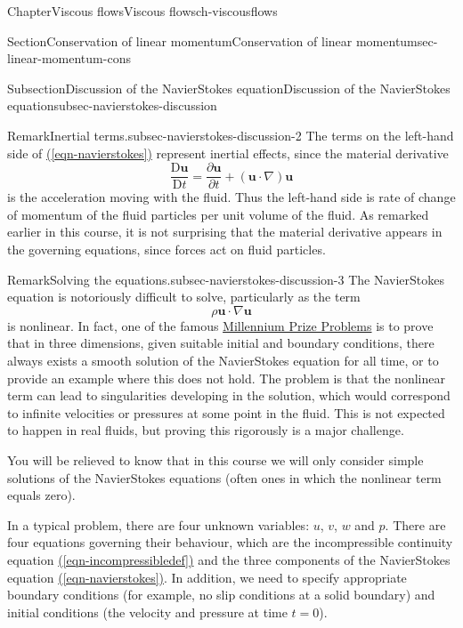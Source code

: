 \documentclass[oneside,10pt,]{book}
\newcommand{\xreffont}{\relax}
\numberwithin{equation}{section}
\newcommand{\DD}[2]{\frac{\mathrm{D}#1}{\mathrm{D}#2}}
\newcommand{\pd}[2]{\frac{\partial#1}{\partial#2}}
\newcommand{\bu}{\boldsymbol{u}}
\begin{document}
\begin{chapterptx}{Chapter}{Viscous flows}{}{Viscous flows}{}{}{ch-viscousflows}
\begin{sectionptx}{Section}{Conservation of linear momentum}{}{Conservation of linear momentum}{}{}{sec-linear-momentum-cons}
\begin{subsectionptx}{Subsection}{Discussion of the Navier\textendash{}Stokes equation}{}{Discussion of the Navier\textendash{}Stokes equation}{}{}{subsec-navierstokes-discussion}
\begin{remark}{Remark}{Inertial terms.}{subsec-navierstokes-discussion-2}%
The terms on the left-hand side of  \hyperref[eqn-navierstokes]{({\xreffont\ref{eqn-navierstokes}})} represent inertial effects, since the material derivative%
\begin{equation*}
\DD{\bu}{t}=\pd{\bu}{t}+(\bu\cdot\nabla)\bu
\end{equation*}
is the acceleration moving with the fluid.  Thus the left-hand side is rate of change of momentum of the fluid particles per unit volume of the fluid. As remarked earlier in this course, it is not surprising that the material derivative appears in the governing equations, since forces act on fluid particles.%
\end{remark}
\begin{remark}{Remark}{Solving the equations.}{subsec-navierstokes-discussion-3}%
The Navier\textendash{}Stokes equation is notoriously difficult to solve, particularly as the term%
\begin{equation*}
\rho\bu\cdot\nabla\bu
\end{equation*}
is nonlinear. In fact, one of the famous \href{https://www.claymath.org/millennium-problems/}{Millennium Prize Problems} is to prove that in three dimensions, given suitable initial and boundary conditions, there always exists a smooth solution of the Navier\textendash{}Stokes equation for all time, or to provide an example where this does not hold. The problem is that the nonlinear term can lead to singularities developing in the solution, which would correspond to infinite velocities or pressures at some point in the fluid. This is not expected to happen in real fluids, but proving this rigorously is a major challenge.%
\par
You will be relieved to know that in this course we will only consider simple solutions of the Navier\textendash{}Stokes equations (often ones in which the nonlinear term equals zero).%
\par
In a typical problem, there are four unknown variables: \(u\), \(v\), \(w\) and \(p\). There are four equations governing their behaviour, which are the incompressible continuity equation \hyperref[eqn-incompressibledef]{({\xreffont\ref{eqn-incompressibledef}})} and the three components of the Navier\textendash{}Stokes equation \hyperref[eqn-navierstokes]{({\xreffont\ref{eqn-navierstokes}})}. In addition, we need to specify appropriate boundary conditions (for example, no slip conditions at a solid boundary) and initial conditions (the velocity and pressure at time \(t=0\)).%

\end{remark}
\end{subsectionptx}
\end{sectionptx}
\end{chapterptx}
\end{document}
